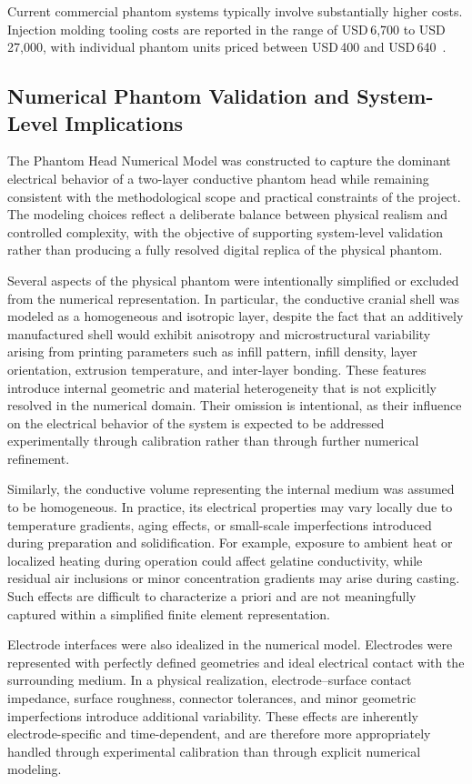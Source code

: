 \documentclass[../00_Main.tex]{subfiles}
\begin{document}
Current commercial phantom systems typically involve substantially higher costs. Injection molding tooling costs are reported in the range of USD\,6,700 to USD\,27,000, with individual phantom units priced between USD\,400 and USD\,640~\cite{akor-2025}.


\subsection{Numerical Phantom Validation and System-Level Implications}

The Phantom Head Numerical Model was constructed to capture the dominant electrical behavior of a two-layer conductive phantom head while remaining consistent with the methodological scope and practical constraints of the project. The modeling choices reflect a deliberate balance between physical realism and controlled complexity, with the objective of supporting system-level validation rather than producing a fully resolved digital replica of the physical phantom.

Several aspects of the physical phantom were intentionally simplified or excluded from the numerical representation. In particular, the conductive cranial shell was modeled as a homogeneous and isotropic layer, despite the fact that an additively manufactured shell would exhibit anisotropy and microstructural variability arising from printing parameters such as infill pattern, infill density, layer orientation, extrusion temperature, and inter-layer bonding. These features introduce internal geometric and material heterogeneity that is not explicitly resolved in the numerical domain. Their omission is intentional, as their influence on the electrical behavior of the system is expected to be addressed experimentally through calibration rather than through further numerical refinement.

Similarly, the conductive volume representing the internal medium was assumed to be homogeneous. In practice, its electrical properties may vary locally due to temperature gradients, aging effects, or small-scale imperfections introduced during preparation and solidification. For example, exposure to ambient heat or localized heating during operation could affect gelatine conductivity, while residual air inclusions or minor concentration gradients may arise during casting. Such effects are difficult to characterize a priori and are not meaningfully captured within a simplified finite element representation.

Electrode interfaces were also idealized in the numerical model. Electrodes were represented with perfectly defined geometries and ideal electrical contact with the surrounding medium. In a physical realization, electrode–surface contact impedance, surface roughness, connector tolerances, and minor geometric imperfections introduce additional variability. These effects are inherently electrode-specific and time-dependent, and are therefore more appropriately handled through experimental calibration than through explicit numerical modeling.
\end{document}
